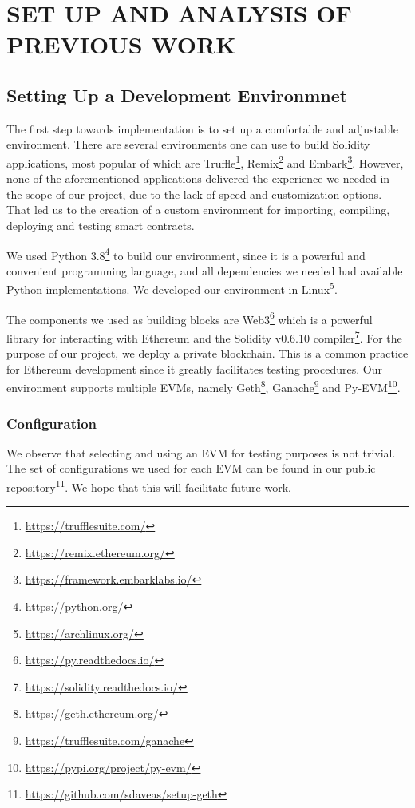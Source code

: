 \chapter{SET UP AND ANALYSIS OF PREVIOUS WORK}

\section{Setting Up a Development Environmnet}

The first step towards implementation is to set up a comfortable and adjustable
environment. There are several environments one can use to build Solidity
applications, most popular of which are
Truffle\footnote{\url{https://trufflesuite.com/}},
Remix\footnote{\url{https://remix.ethereum.org/}} and
Embark\footnote{\url{https://framework.embarklabs.io/}}. However, none of the
aforementioned applications delivered the experience we needed in the scope of
our project, due to the lack of speed and customization options. That led us
to the creation of a custom environment for importing, compiling, deploying
and testing smart contracts.

We used Python 3.8\footnote{\url{https://python.org/}} to build our environment,
since it is a powerful and convenient programming language, and all
dependencies we needed had available Python implementations. We developed our
environment in Linux\footnote{\url{https://archlinux.org/}}.

The components we used as building blocks are
Web3\footnote{\url{https://py.readthedocs.io/}}
which is a powerful library for interacting with Ethereum and the Solidity
v0.6.10 compiler\footnote{\url{https://solidity.readthedocs.io/}}.  For
the purpose of our project, we deploy a private blockchain. This is a common
practice for Ethereum development since it greatly facilitates testing
procedures. Our environment supports multiple EVMs, namely
Geth\footnote{\url{https://geth.ethereum.org/}},
Ganache\footnote{\url{https://trufflesuite.com/ganache}} and
Py-EVM\footnote{\url{https://pypi.org/project/py-evm/}}.

\subsection {Configuration}

We observe that selecting and using an EVM for testing purposes is not trivial.
The set of configurations we used for each EVM can be found in our public
repository\footnote{\url{https://github.com/sdaveas/setup-geth}}. We hope that this
will facilitate future work.

